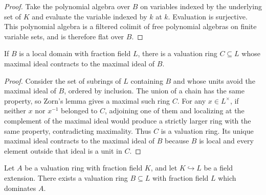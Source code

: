 \begin{proof}
  Take the polynomial algebra over $B$ on variables indexed by the underlying
  set of $K$ and evaluate the variable indexed by $k$ at $k$.  Evaluation is
  surjective.  This polynomial algebra is a filtered colimit of free
  polynomial algebras on finite variable sets, and is therefore flat over
  $B$.
\end{proof}

\begin{lemma}
  \label{lemma:nagata-local-domain-valuation-dominates}

  If $B$ is a local domain with fraction field $L$, there is a valuation ring
  $C\subseteq L$ whose maximal ideal contracts to the maximal ideal of $B$.
\end{lemma}

\begin{proof}
  Consider the set of subrings of $L$ containing $B$ and whose units avoid the
  maximal ideal of $B$, ordered by inclusion.  The union of a chain has the
  same property, so Zorn's lemma gives a maximal such ring $C$.  For any
  $x\in L^\times$, if neither $x$ nor $x^{-1}$ belonged to $C$, adjoining one
  of them and localizing at the complement of the maximal ideal would produce
  a strictly larger ring with the same property, contradicting maximality.
  Thus $C$ is a valuation ring.  Its unique maximal ideal contracts to the
  maximal ideal of $B$ because $B$ is local and every element outside that
  ideal is a unit in $C$.
\end{proof}

\begin{lemma}
  \label{lemma:nagata-valuation-ring-extension}

  Let $A$ be a valuation ring with fraction field $K$, and let
  $K\hookrightarrow L$ be a field extension.  There exists a valuation ring
  $B\subseteq L$ with fraction field $L$ which dominates $A$.
\end{lemma}

